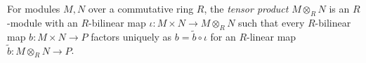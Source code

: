 
For modules $M,N$ over a commutative ring $R$, the \emph{tensor product} $M\otimes_RN$ is an $R$-module with an $R$-bilinear map $\iota:M\times N\to M\otimes_RN$ such that every $R$-bilinear map $b:M\times N\to P$ factors uniquely as $b=\widetilde b\circ\iota$ for an $R$-linear map $\widetilde b:M\otimes_RN\to P$.

